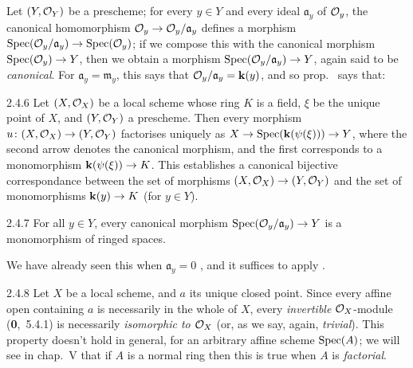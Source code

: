 Let $(Y,\mathcal{O}_Y)$ be a prescheme; for every $y\in Y$ and every ideal
$\mathfrak{a}_y$ of $\mathcal{O}_y$, the canonical homomorphism
$\mathcal{O}_y\to\mathcal{O}_y/\mathfrak{a}_y$ defines a morphism
$\operatorname{Spec}(\mathcal{O}_y/\mathfrak{a}_y)\to\operatorname{Spec}(\mathcal{O}_y)$; if we compose this with the
canonical morphism $\operatorname{Spec}(\mathcal{O}_y)\to Y$, then we obtain a morphism
$\operatorname{Spec}(\mathcal{O}_y/\mathfrak{a}_y)\to Y$, again said to be \textit{canonical}. For
$\mathfrak{a}_y=\mathfrak{m}_y$, this says that $\mathcal{O}_y/\mathfrak{a}_y=\mathbf{k}(y)$, and
so prop.~ says that:
    
\begin{env}[Corollary]{2.4.6}
\label{cor-1.2.4.6}
Let $(X,\mathcal{O}_X)$ be a local scheme
whose ring $K$ is a field, $\xi$ be the unique point of $X$, and $(Y,\mathcal{O}_Y)$ a
prescheme. Then every morphism $u\colon(X,\mathcal{O}_X)\to(Y,\mathcal{O}_Y)$ factorises uniquely
as $X\to\operatorname{Spec}(\mathbf{k}(\psi(\xi)))\to Y$, where the second arrow denotes the canonical
morphism, and the first corresponds to a monomorphism $\mathbf{k}(\psi(\xi))\to K$.
This establishes a canonical bijective correspondance between the set of
morphisms $(X,\mathcal{O}_X)\to (Y,\mathcal{O}_Y)$ and the set of monomorphisms $\mathbf{k}(y)\to K$ (for
$y\in Y$).
\end{env}
    
\begin{env}[Corollary]{2.4.7}
\label{cor-1.2.4.7}
For all $y\in Y$, every canonical morphism
$\operatorname{Spec}(\mathcal{O}_y/\mathfrak{a}_y)\to Y$ is a monomorphism of ringed spaces.
\end{env}
    
We have already seen this when $\mathfrak{a}_y=0$ , and it suffices
to apply .
    
\begin{envr}[Remark]{2.4.8}
\label{rmk-1.2.4.8}
Let $X$ be a local scheme, and $a$ its unique
closed point.  Since every affine open containing $a$ is necessarily in the
whole of $X$, every \emph{invertible} $\mathcal{O}_X$-module (\textbf{0},~5.4.1) is
necessarily \emph{isomorphic to $\mathcal{O}_X$} (or, as we say, again, \emph{trivial}).
This property doesn't hold in general, for an arbitrary affine scheme
$\operatorname{Spec}(A)$; we will see in chap.~V that if $A$ is a normal ring then this is
true when $A$ is {\emph{factorial}}.
\end{envr}


